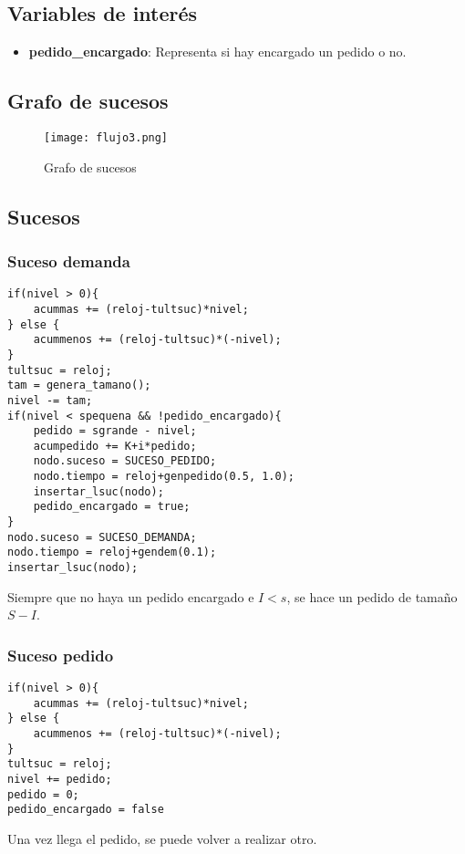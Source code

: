 \subsection{Variables de interés}
\begin{itemize}
	\item \textbf{pedido\_encargado}: Representa si hay encargado un pedido o no.
\end{itemize}

\subsection{Grafo de sucesos}
\begin{figure}[H]
	\centering
	\texttt{[image: flujo3.png]}
	\caption{Grafo de sucesos}
\end{figure}

\subsection{Sucesos}
\subsubsection{Suceso demanda}

\begin{verbatim}
if(nivel > 0){
	acummas += (reloj-tultsuc)*nivel;
} else {
	acummenos += (reloj-tultsuc)*(-nivel);
}
tultsuc = reloj;
tam = genera_tamano();
nivel -= tam;
if(nivel < spequena && !pedido_encargado){
	pedido = sgrande - nivel;
	acumpedido += K+i*pedido;
	nodo.suceso = SUCESO_PEDIDO;
	nodo.tiempo = reloj+genpedido(0.5, 1.0);
	insertar_lsuc(nodo);
	pedido_encargado = true;
}
nodo.suceso = SUCESO_DEMANDA;
nodo.tiempo = reloj+gendem(0.1);
insertar_lsuc(nodo);
\end{verbatim}
Siempre que no haya un pedido encargado e $ I < s $, se hace un pedido de tamaño $ S - I $.

\subsubsection{Suceso pedido}
\begin{verbatim}
if(nivel > 0){
	acummas += (reloj-tultsuc)*nivel;
} else {
	acummenos += (reloj-tultsuc)*(-nivel);
}
tultsuc = reloj;
nivel += pedido;
pedido = 0;
pedido_encargado = false
\end{verbatim}
Una vez llega el pedido, se puede volver a realizar otro.

